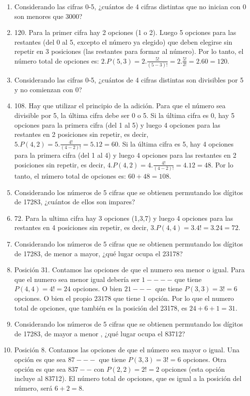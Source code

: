 \documentclass[a4paper]{article}
\newcommand{\answer}{\item[**]}
\begin{document}
\begin{enumerate}
\begin{enumerate} [label=(\alph*)]
		\item Considerando las cifras 0-5, ¿cuántos de 4 cifras distintas que no inician con 0 son menores que 3000?
		\answer 120. Para la primer cifra hay 2 opciones (1 o 2). Luego 5 opciones para las restantes (del 0 al 5, excepto el número ya elegido) que deben elegirse sin repetir en 3 posiciones (las restantes para formar al número). Por lo tanto, el número total de opciones es: $2.P(5,3)= 2. \frac{5!}{(5-3)!}= 2. \frac{5!}{2!} = 2.60=120$.

		\item Considerando las cifras 0-5, ¿cuántos de 4 cifras distintas son divisibles por 5 y no comienzan con 0?
		\answer 108. Hay que utilizar el principio de la adición. Para que el número sea divisible por 5, la última cifra debe ser 0 o 5. Si la última cifra es 0, hay 5 opciones para la primera cifra (del 1 al 5) y luego 4 opciones para las restantes en 2 posiciones sin repetir, es decir, $5.P(4,2)=5.\frac{4!}{(4-2)!}=5.12=60$. Si la última cifra es 5, hay 4 opciones para la primera cifra (del 1 al 4) y luego 4 opciones para las restantes en 2 posiciones sin repetir, es decir, $4.P(4,2)=4.\frac{4!}{(4-2)!}=4.12=48$. Por lo tanto, el número total de opciones es: $60+48=108$.

		\item Considerando los números de 5 cifras que se obtienen permutando los dígitos de 17283, ¿cuántos de ellos son impares?
		\answer 72. Para la ultima cifra hay 3 opciones (1,3,7) y luego 4 opciones para las restantes en 4 posiciones sin repetir, es decir, $3.P(4,4)=3.4!=3.24=72$.

		\item Considerando los números de 5 cifras que se obtienen permutando los dígitos de 17283, de menor a mayor, ¿qué lugar ocupa el 23178?
		\answer Posición 31. Contamos las opciones de que el numero sea menor o igual. Para que el numero sea menor igual debería ser $1----$ que tiene $P(4,4)=4!=24$ opciones. O bien $21---$ que tiene $P(3,3)=3!=6$ opciones. O bien el propio $23178$ que tiene $1$ opción. Por lo que el numero total de opciones, que también es la posición del 23178, es $24+6+1=31$.

		\item Considerando los números de 5 cifras que se obtienen permutando los dígitos de 17283, de mayor a menor , ¿qué lugar ocupa el 83712?
		\answer Posición 8. Contamos las opciones de que el número sea mayor o igual. Una opción es que sea $87---$ que tiene $P(3,3)=3!=6$ opciones. Otra opción es que sea $837--$ con $P(2,2)=2!=2$ opciones (esta opción incluye al 83712). El número total de opciones, que es igual a la posición del número, será $6+2=8$.


\end{enumerate}
\end{enumerate}
\end{document}
